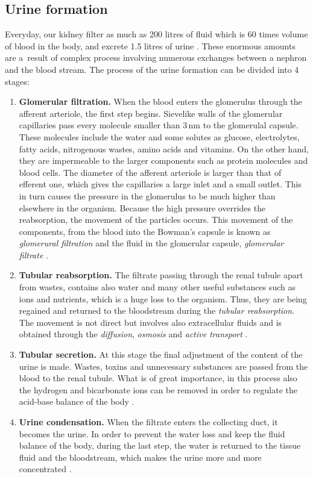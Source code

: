\subsection{Urine formation} 
Everyday, our kidney filter as much as 200 litres of fluid which is 60 times volume of blood in the body, and excrete 1.5 litres of urine \cite{saladin}. These enormous amounts are a~result of complex process involving numerous exchanges between a nephron and the blood stream. The process of the urine formation can be divided into 4 stages:
\begin{enumerate}
\item{\textbf{Glomerular filtration.}} When the blood enters the glomerulus through the afferent arteriole, the first step begins. Sievelike walls of the glomerular capillaries  pass every molecule smaller than 3\,nm to the glomerulal capsule. These molecules include the water and some solutes as glucose, electrolytes, fatty acids, nitrogenous wastes, amino acids and vitamins. On the other hand, they are impermeable to the larger components such as protein molecules and blood cells.  The diameter of the afferent arteriole is larger than that of efferent one, which gives the capillaries a large inlet and a small outlet. This in turn causes the pressure in the glomerulus to be much higher than elsewhere in the organism. Because the high pressure overrides the reabsorption, the movement of the particles occurs. This movement  of  the components, from  the  blood  into  the Bowman's capsule is known as \textit{glomerural filtration} and the fluid in the glomerular capsule, \textit{glomerular filtrate} \cite{saladin, health_and_disease}.

  
\item{\textbf{Tubular reabsorption.}} The filtrate passing through the renal tubule apart from wastes, contains  also water and many other useful substances such as ions and nutrients, which is a huge loss to the organism. Thus, they are being regained and returned to the bloodstream during the \textit{tubular reabsorption}. The movement is not direct but involves also extracellular fluids and is obtained through the \textit{diffusion}, \textit{osmosis} and \textit{active transport} \cite{health_and_disease}.
 
\item{\textbf{Tubular secretion.}} At this stage the final adjustment of the content of the urine is made. Wastes, toxins and unnecessary substances are passed from the blood to the renal tubule. What is of great importance, in this process also the hydrogen and bicarbonate ions can be removed in order to regulate the acid-base balance of the body \cite{health_and_disease}.

\item{\textbf{Urine condensation.}} When the filtrate enters the collecting duct, it becomes the urine. In order to prevent the water loss and keep the fluid balance of the body, during the last step, the water is returned to the tissue fluid and the bloodstream, which makes the urine more and more concentrated \cite{saladin}.

\end{enumerate}
